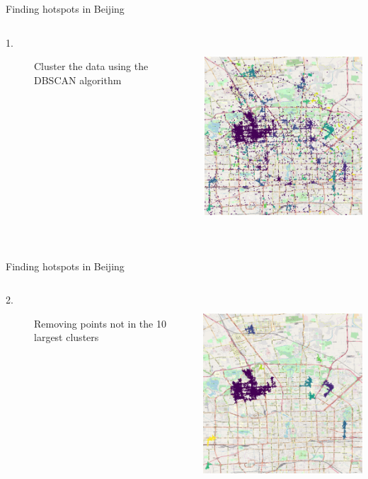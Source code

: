 \documentclass[aspectratio=169]{beamer}
\begin{document}
\begin{frame}{Finding hotspots in Beijing}
\begin{columns}
\begin{column}{0.5\textwidth}
\begin{description}
	\item [1.] Cluster the data using the DBSCAN algorithm
\end{description}
\end{column}
\begin{column}{0.5\textwidth}  %
     \centering
	\includegraphics[height=7.5cm]{figures/cluttered_map}
\end{column}
\end{columns}
\end{frame}

\begin{frame}{Finding hotspots in Beijing}
\begin{columns}
\begin{column}{0.5\textwidth}
\begin{description}
	\item [2.] Removing points not in the 10 largest clusters
\end{description}
\end{column}
\begin{column}{0.5\textwidth}  %
     \centering
	\includegraphics[height=7.5cm]{figures/reduced_map}
\end{column}
\end{columns}
\end{frame}
\end{document}
